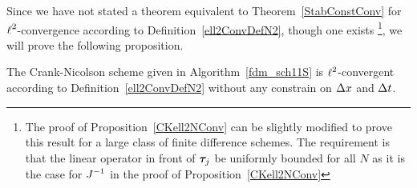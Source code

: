 Since we have not stated a theorem equivalent to
Theorem~\ref{StabConstConv} for $\displaystyle \ell^2$-convergence
according to Definition~\ref{ell2ConvDefN2}, though one exists
\footnote{The proof of Proposition~\ref{CKell2NConv} can be slightly
modified to prove this result for a large class of finite difference
schemes.  The requirement is that the linear operator in front of
$\bm{\tau}_j$ be uniformly bounded for all $N$ as it is the case
for $\displaystyle J^{-1}$ in the proof of Proposition~\ref{CKell2NConv}}, we
will prove the following proposition.

\begin{prop} \label{CKell2NConv}
The Crank-Nicolson scheme given in Algorithm~\ref{fdm_sch11S}
is $\displaystyle \ell^2$-convergent according to Definition~\ref{ell2ConvDefN2}
without any constrain on $\Delta{x}$ and $\Delta{t}$.
\end{prop}

